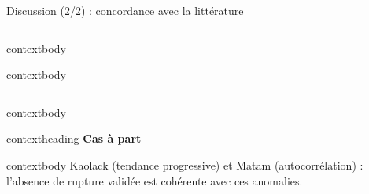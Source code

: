 \documentclass[aspectratio=169,11pt]{beamer}
\begin{document}
\begin{frame}{Discussion (2/2) : concordance avec la littérature}
\begin{columns}[T,onlytextwidth]
\begin{beamercolorbox}[wd=\linewidth,rounded=true,sep=0pt]{contextbody}
\begin{beamercolorbox}[wd=\linewidth,sep=0.08cm]{contextbody}
\begin{itemize}
          \end{itemize}
        \end{beamercolorbox}
      \end{beamercolorbox}
  \end{columns}
  \vspace{0.16cm}
  \begin{beamercolorbox}[wd=\textwidth,rounded=true,sep=0pt]{contextbody}
    \begin{beamercolorbox}[wd=\linewidth,ht=0.36cm,dp=0.08cm,leftskip=0.14cm]{contextheading}
      {\color{marine}\bfseries Cas à part}
    \end{beamercolorbox}
    \begin{beamercolorbox}[wd=\linewidth,sep=0.09cm]{contextbody}
      \footnotesize Kaolack (tendance progressive) et Matam (autocorrélation) : l’absence de rupture validée est cohérente avec ces anomalies.
    \end{beamercolorbox}
  \end{beamercolorbox}
\end{frame}
\end{document}
